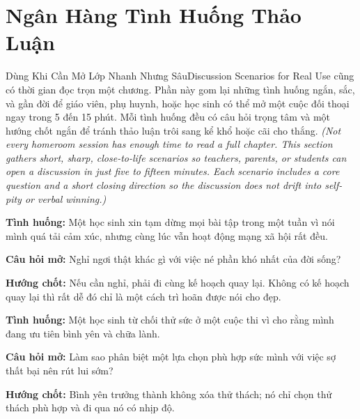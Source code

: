 \chapter*{Ngân Hàng Tình Huống Thảo Luận}

\begin{truyen}{Dùng Khi Cần Mở Lớp Nhanh Nhưng Sâu}{Discussion Scenarios for Real Use}
 cũng có thời gian đọc trọn một chương. Phần này gom lại những tình huống ngắn, sắc, và gần đời để giáo viên, phụ huynh, hoặc học sinh có thể mở một cuộc đối thoại ngay trong 5 đến 15 phút. Mỗi tình huống đều có câu hỏi trọng tâm và một hướng chốt ngắn để tránh thảo luận trôi sang kể khổ hoặc cãi cho thắng.
\textit{(Not every homeroom session has enough time to read a full chapter. This section gathers short, sharp, close-to-life scenarios so teachers, parents, or students can open a discussion in just five to fifteen minutes. Each scenario includes a core question and a short closing direction so the discussion does not drift into self-pity or verbal winning.)}
\end{truyen}

\newcommand{\tinhhuong}[4]{%
\begin{tcolorbox}[
  colback=bookbg,
  colframe=booksecondary!70!black,
  arc=4pt,
  boxrule=0.8pt,
  title={#1},
  fonttitle=\bfseries,
  breakable,
  enhanced
]
\textbf{Tình huống:} #2

\vspace{0.2cm}
\textbf{Câu hỏi mở:} #3

\vspace{0.2cm}
\textbf{Hướng chốt:} #4
\end{tcolorbox}
\vspace{0.45cm}
}

\tinhhuong{Tình huống 1. Em Chỉ Muốn Nghỉ Một Chút}{Một học sinh xin tạm dừng mọi bài tập trong một tuần vì nói mình quá tải cảm xúc, nhưng cùng lúc vẫn hoạt động mạng xã hội rất đều.}{Nghỉ ngơi thật khác gì với việc né phần khó nhất của đời sống?}{Nếu cần nghỉ, phải đi cùng kế hoạch quay lại. Không có kế hoạch quay lại thì rất dễ đó chỉ là một cách trì hoãn được nói cho đẹp.}

\tinhhuong{Tình huống 2. Em Đang Chọn Bình Yên}{Một học sinh từ chối thử sức ở một cuộc thi vì cho rằng mình đang ưu tiên bình yên và chữa lành.}{Làm sao phân biệt một lựa chọn phù hợp sức mình với việc sợ thất bại nên rút lui sớm?}{Bình yên trưởng thành không xóa thử thách; nó chỉ chọn thử thách phù hợp và đi qua nó có nhịp độ.}

